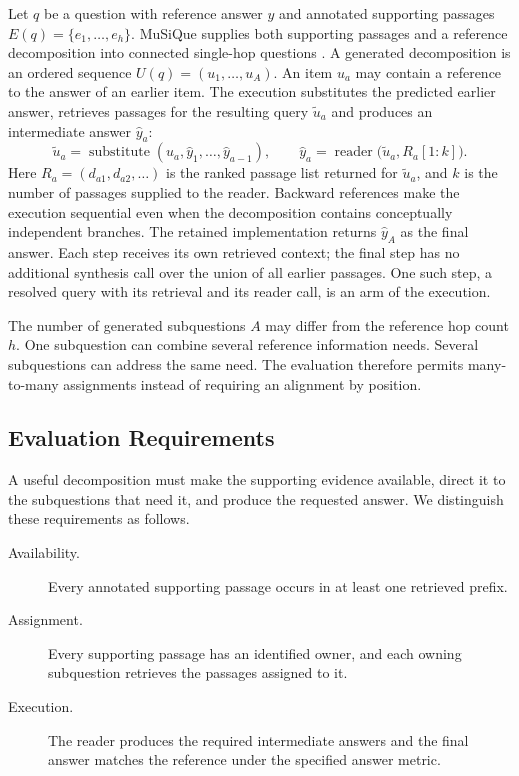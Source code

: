 Let $q$ be a question with reference answer $y$ and annotated supporting
passages $E(q)=\{e_1,\ldots,e_h\}$. MuSiQue supplies both supporting passages
and a reference decomposition into connected single-hop questions
\cite{trivedi2022musique}. A generated decomposition is an ordered sequence
$U(q)=(u_1,\ldots,u_A)$. An item $u_a$ may contain a reference to the answer of
an earlier item. The execution substitutes the predicted earlier answer,
retrieves passages for the resulting query $\widetilde u_a$ and produces an
intermediate answer $\widehat y_a$:
\begin{equation}
  \widetilde u_a
  = \operatorname{substitute}(u_a,\widehat y_1,\ldots,\widehat y_{a-1}),
  \qquad
  \widehat y_a
  = \operatorname{reader}\bigl(\widetilde u_a,R_a[1:k]\bigr).
  \label{eq:ch4-execution}
\end{equation}
Here $R_a=(d_{a1},d_{a2},\ldots)$ is the ranked passage list returned for
$\widetilde u_a$, and $k$ is the number of passages supplied to the reader.
Backward references make the execution sequential even when the decomposition
contains conceptually independent branches. The retained implementation returns
$\widehat y_A$ as the final answer. Each step receives its own retrieved
context; the final step has no additional synthesis call over the union of all
earlier passages. One such step, a resolved query with its retrieval and its
reader call, is an arm of the execution.

The number of generated subquestions $A$ may differ from the reference hop
count $h$. One subquestion can combine several reference information needs.
Several subquestions can address the same need. The evaluation therefore permits
many-to-many assignments instead of requiring an alignment by position.

\subsection{Evaluation Requirements}

A useful decomposition must make the supporting evidence available, direct it
to the subquestions that need it, and produce the requested answer. We
distinguish these requirements as follows.
\begin{description}
  \item[Availability.] Every annotated supporting passage occurs in at least
  one retrieved prefix.
  \item[Assignment.] Every supporting passage has an identified owner, and
  each owning subquestion retrieves the passages assigned to it.
  \item[Execution.] The reader produces the required intermediate answers
  and the final answer matches the reference under the specified answer metric.
\end{description}

